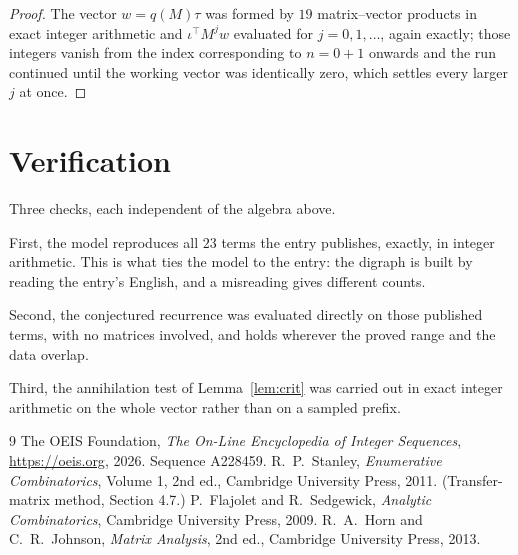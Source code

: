 \documentclass[11pt,a4paper]{article}
\theoremstyle{plain}
\theoremstyle{definition}
\begin{document}
\begin{proof}
The vector $w=q(M)\tau$ was formed by $19$ matrix--vector products in exact integer
arithmetic and $\iota^{\!\top}M^{j}w$ evaluated for $j=0,1,\dots$, again exactly; those
integers vanish from the index corresponding to $n=0+1$ onwards and the run continued
until the working vector was identically zero, which settles every larger $j$ at once.
\end{proof}

\section{Verification}

Three checks, each independent of the algebra above.

First, the model reproduces all $23$ terms the entry publishes, exactly, in integer
arithmetic. This is what ties the model to the entry: the digraph is built by reading the
entry's English, and a misreading gives different counts.

Second, the conjectured recurrence was evaluated directly on those published terms, with no
matrices involved, and holds wherever the proved range and the data overlap.

Third, the annihilation test of Lemma~\ref{lem:crit} was carried out in exact integer
arithmetic on the whole vector rather than on a sampled prefix.

\begin{thebibliography}{9}
 The OEIS Foundation, \emph{The On-Line Encyclopedia of Integer
Sequences}, \url{https://oeis.org}, 2026. Sequence A228459.
 R.~P.~Stanley, \emph{Enumerative Combinatorics}, Volume 1, 2nd ed.,
Cambridge University Press, 2011. (Transfer-matrix method, Section 4.7.)
 P.~Flajolet and R.~Sedgewick, \emph{Analytic Combinatorics}, Cambridge
University Press, 2009.
 R.~A.~Horn and C.~R.~Johnson, \emph{Matrix Analysis}, 2nd ed., Cambridge
University Press, 2013.
\end{thebibliography}
\end{document}
